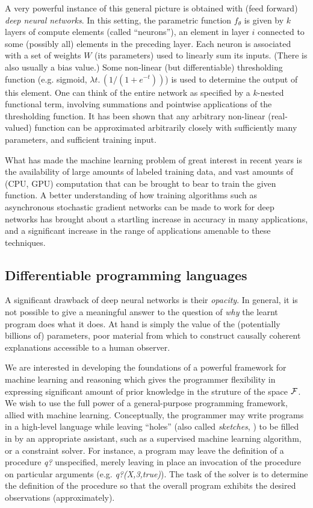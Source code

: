 \documentclass{article} %
\begin{document}
A very powerful instance of this general picture is obtained with
(feed forward) {\em
  deep neural networks}. In this setting, the parametric function
$f_{\theta}$ is given by $k$ layers of compute elements (called
``neurons''), an element in layer $i$ connected to some (possibly all)
elements in the preceding layer. Each neuron is associated with a set
of weights $W$ (its parameters) used to linearly sum its inputs.
(There is also usually a bias value.) Some non-linear
(but differentiable) thresholding function (e.g. sigmoid, $\lambda
t.\,(1/(1+e^{-t}))$) is used to determine the output of this
element. One can think of the entire network as specified by a
$k$-nested functional term, involving summations and pointwise
applications of the thresholding function. It has been shown that any
arbitrary non-linear (real-valued) function can be approximated
arbitrarily closely with sufficiently many parameters, and sufficient
training input. 

What has made the machine learning problem of great interest in recent
years is the availability of large amounts of labeled training data,
and vast amounts of (CPU, GPU) computation that can be brought to bear
to train the given function. A better understanding of how training
algorithms such as asynchronous stochastic gradient networks can be
made to work for deep networks has brought about a startling increase
in accuracy in many applications, and a significant increase in the
range of applications amenable to these techniques.

\subsection{Differentiable programming languages}
A significant drawback of deep neural networks is their {\em
  opacity}. In general, it is not possible to give a meaningful answer
to the question of {\em why} the learnt program does what it
does. At hand is simply the value of the (potentially billions of)
parameters, poor material from which to construct causally coherent
explanations accessible to a human observer.

We are interested in developing the foundations of a powerful framework for machine learning and reasoning which gives the programmer flexibility in expressing significant amount of prior knowledge in the struture of the space $\cal F$. We wish to use the full power of a general-purpose programming framework, allied with machine learning. Conceptually, the programmer may write programs in a high-level language while leaving ``holes'' (also called {\em sketches}, \cite{solar-lezama:asplos06}) to be filled in by an appropriate assistant, such as a supervised machine learning algorithm, or a constraint solver. For instance, a program may leave the definition of a procedure {\em q?} unspecified, merely leaving in place an invocation of the procedure on particular arguments (e.g.{} {\em q?(X,3,true)}). The task of the solver is to determine the definition of the procedure so that the overall program exhibits the desired observations (approximately). 
\end{document}
